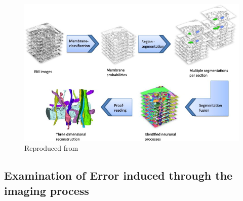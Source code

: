 \begin{figure}[h]
    \centering
    \includegraphics[scale=0.75]{figures/images/reconstruction.jpg}
    {Reproduced from \cite{kaynig_large-scale_2015}}
    \label{reconstruction}
\end{figure}
\vspace{1ex}


\subsection[Error induced through noise]{Examination of Error induced through the imaging process}




